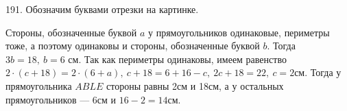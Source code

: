 191. Обозначим буквами отрезки на картинке.
\begin{center}
\begin{figure}[ht!]
\end{figure}
\end{center}
Стороны, обозначенные буквой $a$ у прямоугольников одинаковые, периметры тоже, а поэтому одинаковы и стороны, обозначенные буквой $b.$ Тогда $3b=18,\ b=6$ см. Так как периметры одинаковы, имеем равенство $2\cdot(c+18)=2\cdot(6+a),\ c+18=6+16-c,\ 2c+18=22,\ c=2$см. Тогда у прямоугольника $ABLE$ стороны равны 2см и 18см, а у остальных прямоугольников --- 6см и $16-2=14$см.\\
